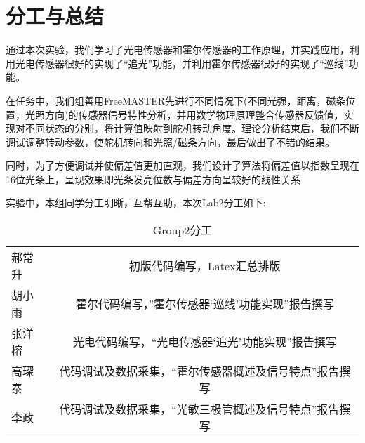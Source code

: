 \section{分工与总结}
\par{通过本次实验，我们学习了光电传感器和霍尔传感器的工作原理，并实践应用，利用光电传感器很好的实现了“追光”功能，并利用霍尔传感器很好的实现了“巡线”功能。}
\par{在任务中，我们组善用FreeMASTER先进行不同情况下(不同光强，距离，磁条位置，光照方向)的传感器信号特性分析，并用数学物理原理整合传感器反馈值，实现对不同状态的分别，将计算值映射到舵机转动角度。理论分析结束后，我们不断调试调整转动参数，使舵机转向和光照/磁条方向，最后做出了不错的结果。}
\par{同时，为了方便调试并使偏差值更加直观，我们设计了算法将偏差值以指数呈现在16位光条上，呈现效果即光条发亮位数与偏差方向呈较好的线性关系}
\par{实验中，本组同学分工明晰，互帮互助，本次Lab2分工如下:}
\begin{table}[h]
	\centering
	\begin{tabular}{|l|c|}
		郝常升&初版代码编写，Latex汇总排版\\
		胡小雨&霍尔代码编写，”霍尔传感器‘巡线’功能实现”报告撰写\\
		张洋榕&光电代码编写，“光电传感器‘追光’功能实现”报告撰写\\
		高琛泰&代码调试及数据采集，“霍尔传感器概述及信号特点”报告撰写\\
		李政&代码调试及数据采集，“光敏三极管概述及信号特点”报告撰写\\
	\end{tabular}
	\caption{Group2分工}
	\label{tab:Group2FG}
\end{table} 